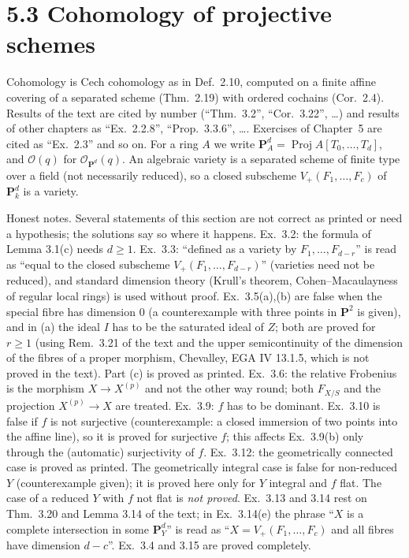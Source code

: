 \documentclass[11pt]{article}
\begin{document}
\section*{5.3 Cohomology of projective schemes}

Cohomology is Cech cohomology as in Def.~2.10, computed on a finite affine covering of a separated scheme (Thm.~2.19) with ordered cochains (Cor.~2.4). Results of the text are cited by number (``Thm.~3.2'', ``Cor.~3.22'', \dots) and results of other chapters as ``Ex.~2.2.8'', ``Prop.~3.3.6'', \dots. Exercises of Chapter~5 are cited as ``Ex.~2.3'' and so on. For a ring $A$ we write $\mathbf P^d_A=\operatorname{Proj}A[T_0,\dots,T_d]$, and $\mathcal O(q)$ for $\mathcal O_{\mathbf P^d}(q)$. An algebraic variety is a separated scheme of finite type over a field (not necessarily reduced), so a closed subscheme $V_+(F_1,\dots,F_c)$ of $\mathbf P^d_k$ is a variety.

Honest notes. Several statements of this section are not correct as printed or need a hypothesis; the solutions say so where it happens.
Ex.~3.2: the formula of Lemma 3.1(c) needs $d\ge1$.
Ex.~3.3: ``defined as a variety by $F_1,\dots,F_{d-r}$'' is read as ``equal to the closed subscheme $V_+(F_1,\dots,F_{d-r})$'' (varieties need not be reduced), and standard dimension theory (Krull's theorem, Cohen--Macaulayness of regular local rings) is used without proof.
Ex.~3.5(a),(b) are false when the special fibre has dimension $0$ (a counterexample with three points in $\mathbf P^2$ is given), and in (a) the ideal $I$ has to be the saturated ideal of $Z$; both are proved for $r\ge1$ (using Rem.~3.21 of the text and the upper semicontinuity of the dimension of the fibres of a proper morphism, Chevalley, EGA IV 13.1.5, which is not proved in the text). Part (c) is proved as printed.
Ex.~3.6: the relative Frobenius is the morphism $X\to X^{(p)}$ and not the other way round; both $F_{X/S}$ and the projection $X^{(p)}\to X$ are treated.
Ex.~3.9: $f$ has to be dominant.
Ex.~3.10 is false if $f$ is not surjective (counterexample: a closed immersion of two points into the affine line), so it is proved for surjective $f$; this affects Ex.~3.9(b) only through the (automatic) surjectivity of $f$.
Ex.~3.12: the geometrically connected case is proved as printed. The geometrically integral case is false for non-reduced $Y$ (counterexample given); it is proved here only for $Y$ integral and $f$ flat. The case of a reduced $Y$ with $f$ not flat is \emph{not proved}.
Ex.~3.13 and 3.14 rest on Thm.~3.20 and Lemma 3.14 of the text; in Ex.~3.14(e) the phrase ``$X$ is a complete intersection in some $\mathbf P^d_Y$'' is read as ``$X=V_+(F_1,\dots,F_c)$ and all fibres have dimension $d-c$''. Ex.~3.4 and 3.15 are proved completely.
\end{document}
